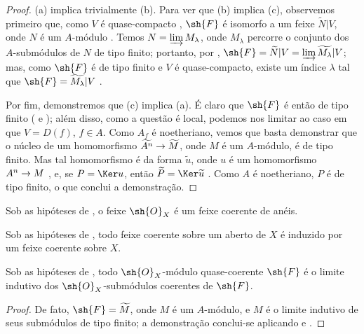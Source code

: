 \documentclass[oneside]{amsart}
\makeatletter
\newcommand{\ega@arrow}[2]{\mathchoice{#1}{#2}{#2}{#2}}
\renewcommand{\to}{\ega@arrow{\longrightarrow}{\rightarrow}}
\newcommand{\oldpage}[2][]{{\marginnote{\normalfont\textbf{#1}~|~#2}}\ignorespaces}
\let\EGAOriginalLabel\label
\renewcommand{\label}[1]{\phantomsection\EGAOriginalLabel{#1}}
\makeatother
\begin{document}
\begin{proof}
\oldpage[I]{93}
(a) implica trivialmente (b).
Para ver que (b) implica (c), observemos primeiro que, como $V$ é quase-compacto , $\sh{F}$ é isomorfo a um feixe $\widetilde{N}|V$, onde $N$ é um $A$-módulo .
Temos $N=\varinjlim M_\lambda$, onde $M_\lambda$ percorre o conjunto dos $A$-submódulos de $N$ de tipo finito; portanto, por , $\sh{F}=\widetilde{N}|V=\varinjlim\widetilde{M_\lambda}|V$;
mas, como $\sh{F}$ é de tipo finito e $V$ é quase-compacto, existe um índice $\lambda$ tal que $\sh{F}=\widetilde{M_\lambda}|V$ .

Por fim, demonstremos que (c) implica (a).
É claro que $\sh{F}$ é então de tipo finito ( e );
além disso, como a questão é local, podemos nos limitar ao caso em que $V=D(f)$, $f\in A$.
Como $A_f$ é noetheriano, vemos que basta demonstrar que o núcleo de um homomorfismo $\widetilde{A^n}\to\widetilde{M}$, onde $M$ é um $A$-módulo, é de tipo finito.
Mas tal homomorfismo é da forma $\widetilde{u}$, onde $u$ é um homomorfismo $A^n\to M$ , e, se $P=\Ker u$, então $\widetilde{P}=\Ker\widetilde{u}$ .
Como $A$ é noetheriano, $P$ é de tipo finito, o que conclui a demonstração.
\end{proof}

\begin{corollary}[1.5.2]
\label{I.1.5.2}
Sob as hipóteses de , o feixe $\sh{O}_X$ é um feixe coerente de anéis.
\end{corollary}

\begin{corollary}[1.5.3]
\label{I.1.5.3}
Sob as hipóteses de , todo feixe coerente sobre um aberto de $X$ é induzido por um feixe coerente sobre $X$.
\end{corollary}

\begin{corollary}[1.5.4]
\label{I.1.5.4}
Sob as hipóteses de , todo $\sh{O}_X$-módulo quase-coerente $\sh{F}$ é o limite indutivo dos $\sh{O}_X$-submódulos coerentes de $\sh{F}$.
\end{corollary}

\begin{proof}
De fato, $\sh{F}=\widetilde{M}$, onde $M$ é um $A$-módulo, e $M$ é o limite indutivo de seus submódulos de tipo finito;
a demonstração conclui-se aplicando  e .
\end{proof}
\end{document}
